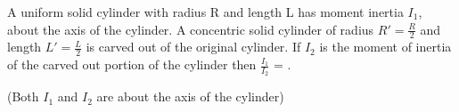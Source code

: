 \item A uniform solid cylinder with radius R and length L has moment inertia $I_1$, about the axis of the cylinder. A concentric solid cylinder of radius $R' = \frac{R}{2}$ and length $L' = \frac{L}{2}$ is carved out of the original cylinder. If $I_2$ is the moment of inertia of the carved out portion of the cylinder then $\frac{I_1}{I_2}$ =
        \underline{\hspace{2.5cm}}.
    \begin{center}
    \end{center}
(Both $I_1$ and $I_2$ are about the axis of the cylinder)